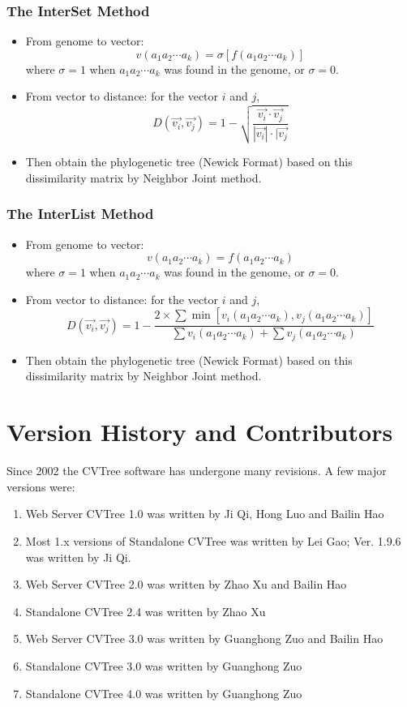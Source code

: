 \documentclass[a4paper,12pt]{article}
\begin{document}
\subsubsection{The InterSet Method}
\begin{itemize}
	\item From genome to vector: $$v(a_1 a_2 \cdots a_k) = \sigma [f(a_1a_2 \cdots a_k)]$$
	where $\sigma = 1$ when $a_1a_2\cdots a_k$ was found in the genome, or $\sigma = 0$.
	\item From vector to distance: for the vector $i$ and $j$,
	$$D(\vec{v_i},\vec{v_j})= 1 -\sqrt{\frac{\vec{v_i}
				\cdot \vec{v_j}}{|\vec{v_i}| \cdot |\vec{v_j}}}$$
	\item Then obtain the phylogenetic tree (Newick Format) based on this
	dissimilarity matrix by Neighbor Joint method.
\end{itemize}

\subsubsection{The InterList Method}
\begin{itemize}
	\item From genome to vector: $$v(a_1a_2\cdots a_k)= f(a_1a_2 \cdots a_k)$$
	where $\sigma = 1$ when $a_1a_2\cdots a_k$ was found in the genome, or $\sigma = 0$.
	\item From vector to distance: for the vector $i$ and $j$,
	$$D(\vec{v_i},\vec{v_j})= 1-\frac{2 \times \sum \min[v_i(a_1a_2\cdots a_k),
				v_j(a_1a_2\cdots a_k)]}{\sum v_i(a_1a_2\cdots a_k) + \sum v_j(a_1a_2\cdots a_k)}$$
	\item Then obtain the phylogenetic tree (Newick Format) based on this
	dissimilarity matrix by Neighbor Joint method.
\end{itemize}

\section{Version History and Contributors}

Since 2002 the CVTree software has undergone many revisions. A few major
versions were:
\begin{enumerate}\itemsep 0pt
	\item Web Server CVTree 1.0 was written by Ji Qi, Hong Luo and Bailin Hao
	\item Most 1.x versions of Standalone CVTree was written by Lei Gao;
	   Ver. 1.9.6 was written by Ji Qi.
	\item Web Server CVTree 2.0 was written by Zhao Xu and Bailin Hao
	\item Standalone CVTree 2.4 was written by Zhao Xu
	\item Web Server CVTree 3.0 was written by Guanghong Zuo and Bailin Hao
	\item Standalone CVTree 3.0 was written by Guanghong Zuo
	\item Standalone CVTree 4.0 was written by Guanghong Zuo
\end{enumerate}
\end{document}
